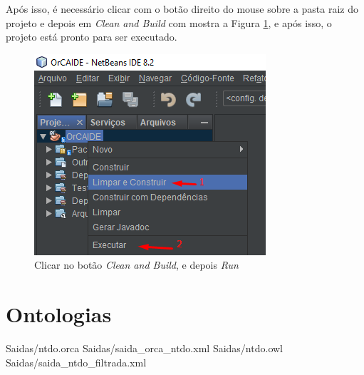 \documentclass{bcc}
\begin{document}
Após isso, é necessário clicar com o botão direito do mouse sobre a pasta raiz do projeto e depois em \textit{Clean and Build} com mostra a Figura \ref{fig:install6}, e após isso, o projeto está pronto para ser executado.

\begin{figure}[H]
\centering
\includegraphics[width=.6\textwidth]{Figuras/install6.png}
\caption{Clicar no botão \textit{Clean and Build}, e depois \textit{Run}} 
\label{fig:install6}
\end{figure}

\chapter{Ontologias} 
\label{chap:apOntologia}
 {Saidas/ntdo.orca}
 {Saidas/saida_orca_ntdo.xml}
 {Saidas/ntdo.owl}
 {Saidas/saida_ntdo_filtrada.xml}
\end{document}
